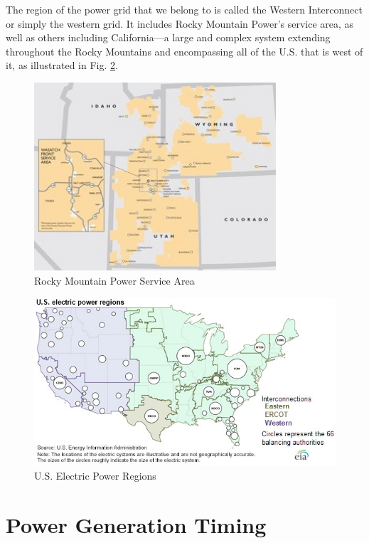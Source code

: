 \documentclass[10pt]{article}
\begin{document}
The region of the power grid that we belong to is called the Western Interconnect or simply the western grid. It includes Rocky Mountain Power's service area, as well as others including California---a large and complex system extending throughout the Rocky Mountains and encompassing all of the U.S. that is west of it, as illustrated in Fig. \ref{grid}.

\medskip
            \begin{figure}[h]
            \centering
            \includegraphics[width=9cm]{extras21/servicearea.jpg}
            \caption{Rocky Mountain Power Service Area \cite{servicearea}}
            \label{rmp}
            \end{figure}


            \begin{figure}[h]
            \centering
            \includegraphics[width=13.5cm]{extras21/elect_power_regions.jpg}
            \caption{U.S. Electric Power Regions  \cite{howelectricity}}
            \label{grid}
            \end{figure}



\section{Power Generation Timing%
}
\end{document}
